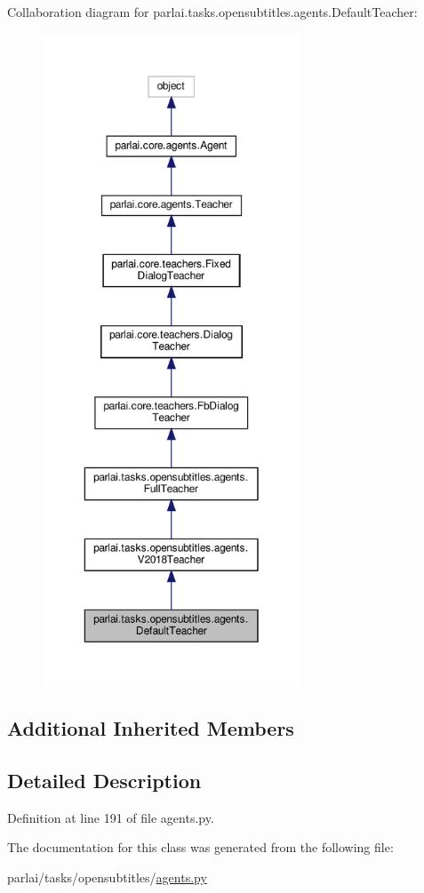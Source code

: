 Collaboration diagram for parlai.\+tasks.\+opensubtitles.\+agents.\+Default\+Teacher\+:\nopagebreak
\begin{figure}[H]
\begin{center}
\leavevmode
\includegraphics[height=550pt]{db/de3/classparlai_1_1tasks_1_1opensubtitles_1_1agents_1_1DefaultTeacher__coll__graph}
\end{center}
\end{figure}
\subsection*{Additional Inherited Members}


\subsection{Detailed Description}


Definition at line 191 of file agents.\+py.



The documentation for this class was generated from the following file\+:\begin{DoxyCompactItemize}
\item 
parlai/tasks/opensubtitles/\hyperlink{parlai_2tasks_2opensubtitles_2agents_8py}{agents.\+py}\end{DoxyCompactItemize}
